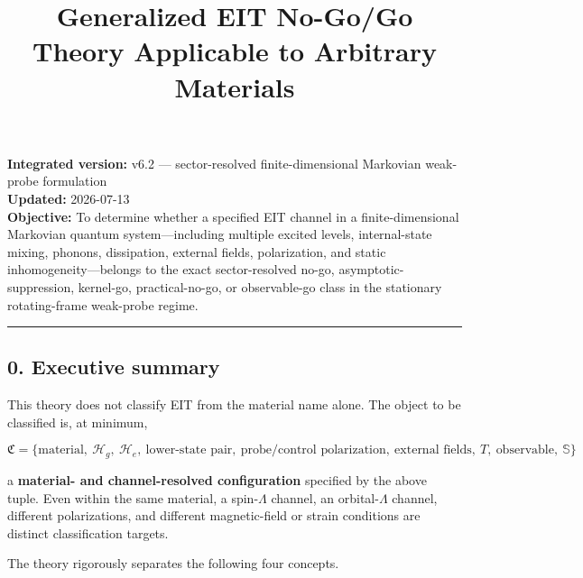 \documentclass[
  10pt,
  a4paper,
]{article}
\title{Generalized EIT No-Go/Go Theory Applicable to Arbitrary
Materials}
\author{}
\date{}
\begin{document}
\maketitle

\textbf{Integrated version:} v6.2 --- sector-resolved finite-dimensional
Markovian weak-probe formulation\\
\textbf{Updated:} 2026-07-13\\
\textbf{Objective:} To determine whether a specified EIT channel in a
finite-dimensional Markovian quantum system---including multiple excited
levels, internal-state mixing, phonons, dissipation, external fields,
polarization, and static inhomogeneity---belongs to the exact
sector-resolved no-go, asymptotic-suppression, kernel-go,
practical-no-go, or observable-go class in the stationary rotating-frame
weak-probe regime.

\begin{center}\rule{0.5\linewidth}{0.5pt}\end{center}

\subsection{0. Executive summary}\label{executive-summary}

This theory does not classify EIT from the material name alone. The
object to be classified is, at minimum,

\[
\boxed{
\mathfrak C=
\{\text{material},\ \mathcal H_g,\ \mathcal H_e,\ \text{lower-state pair},\
\text{probe/control polarization},\ \text{external fields},\ T,\ \text{observable},\ \mathbb S\}
}
\]

a \textbf{material- and channel-resolved configuration} specified by the
above tuple. Even within the same material, a spin-\(\Lambda\) channel,
an orbital-\(\Lambda\) channel, different polarizations, and different
magnetic-field or strain conditions are distinct classification targets.

The theory rigorously separates the following four concepts.
\end{document}
